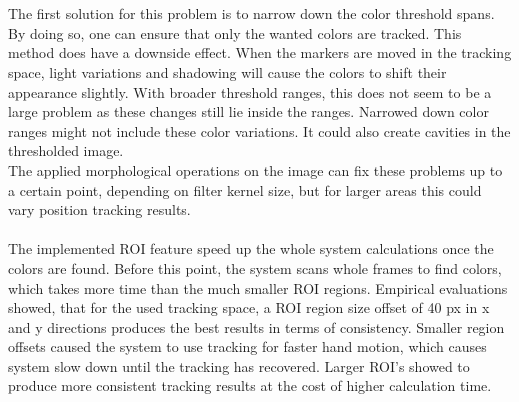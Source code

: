 \\\\The first solution for this problem is to narrow down the color threshold spans. By doing so, one can ensure that only the wanted colors are tracked. This method does have a downside effect. When the markers are moved in the tracking space, light variations and shadowing will cause the colors to shift their appearance slightly. With broader threshold ranges, this does not seem to be a large problem as these changes still lie inside the ranges. Narrowed down color ranges might not include these color variations. It could also create cavities in the thresholded image.\\ The applied morphological operations on the image can fix these problems up to a certain point, depending on filter kernel size, but for larger areas this could vary position tracking results.\\\\The implemented ROI feature speed up the whole system calculations once the colors are found. Before this point, the system scans whole frames to find colors, which takes more time than the much smaller ROI regions.
Empirical evaluations showed, that for the used tracking space, a ROI region size offset of 40 px in x and y directions produces the best results in terms of consistency. Smaller region offsets caused the system to use tracking for faster hand motion, which causes system slow down until the tracking has recovered. Larger ROI's showed to produce more consistent tracking results at the cost of higher calculation time.
